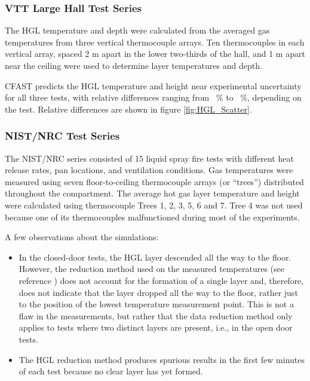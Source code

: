 \subsubsection{VTT Large Hall Test Series}


The HGL temperature and depth were calculated from the averaged gas temperatures from three vertical thermocouple arrays.  Ten thermocouples in each vertical array, spaced 2 m apart in the lower two-thirds of the hall, and 1 m apart near the ceiling were used to determine layer temperatures and depth.  

CFAST predicts the HGL temperature and height near experimental uncertainty for all three tests, with relative differences ranging from \HGLvttlow~\% to \HGLvtthi~\%, depending on the test. Relative differences are shown in figure \ref{fig:HGL_Scatter}.

\subsubsection{NIST/NRC Test Series}

The NIST/NRC series consisted of 15 liquid spray fire tests with different heat release rates, pan locations, and ventilation conditions.  Gas temperatures were measured using seven floor-to-ceiling thermocouple arrays (or ``trees'') distributed throughout the compartment.  The average hot gas layer temperature and height were calculated using thermocouple Trees 1, 2, 3, 5, 6 and 7. Tree 4 was not used because one of its thermocouples malfunctioned during most of the experiments.  

A few observations about the simulations:
\begin{itemize}
\item In the closed-door tests, the HGL layer descended all the way to the floor.  However, the reduction method used on the measured temperatures (see reference \cite{McGrattan:2003}) does not account for the formation of a single layer and, therefore, does not indicate that the layer dropped all the way to the floor, rather just to the position of the lowest temperature measurement point.  This is not a flaw in the measurements, but rather that the data reduction method only applies to tests where two distinct layers are present, i.e., in the open door tests.
\item The HGL reduction method produces spurious results in the first few minutes of each test because no clear layer has yet formed.
\end{itemize}

